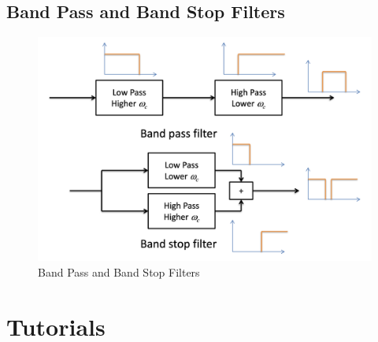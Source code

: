 \documentclass[oneside]{book}
\begin{document}
            \section{Band Pass and Band Stop Filters}
                \begin{figure}[H]
                    \centering
                    \includegraphics[width=0.6\linewidth]{figures/band_pass_stop.png}
                    \caption{Band Pass and Band Stop Filters}
                \end{figure}
        \listoffigures
        \chapter{Tutorials}
            
\end{document}
